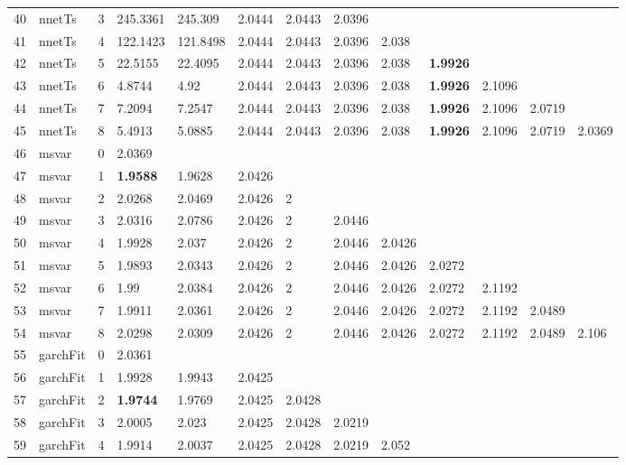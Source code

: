 \documentclass[10pt,a4paper]{article}
\begin{document}
\begin{table}[ht]
\begin{tabular}{rlrllllllllll}
  40 & nnetTs &     3 & 245.3361 & 245.309 & 2.0444 & 2.0443 & 2.0396 &  &  &  &  &  \\ 
  41 & nnetTs &     4 & 122.1423 & 121.8498 & 2.0444 & 2.0443 & 2.0396 & 2.038 &  &  &  &  \\ 
  42 & nnetTs &     5 & 22.5155 & 22.4095 & 2.0444 & 2.0443 & 2.0396 & 2.038 & \textbf{1.9926} &  &  &  \\ 
  43 & nnetTs &     6 & 4.8744 & 4.92 & 2.0444 & 2.0443 & 2.0396 & 2.038 & \textbf{1.9926} & 2.1096 &  &  \\ 
  44 & nnetTs &     7 & 7.2094 & 7.2547 & 2.0444 & 2.0443 & 2.0396 & 2.038 & \textbf{1.9926} & 2.1096 & 2.0719 &  \\ 
  45 & nnetTs &     8 & 5.4913 & 5.0885 & 2.0444 & 2.0443 & 2.0396 & 2.038 & \textbf{1.9926} & 2.1096 & 2.0719 & 2.0369 \\ 
   \hline
46 & msvar &     0 & 2.0369 &  &  &  &  &  &  &  &  &  \\ 
  47 & msvar &     1 & \textbf{1.9588} & 1.9628 & 2.0426 &  &  &  &  &  &  &  \\ 
  48 & msvar &     2 & 2.0268 & 2.0469 & 2.0426 & 2 &  &  &  &  &  &  \\ 
  49 & msvar &     3 & 2.0316 & 2.0786 & 2.0426 & 2 & 2.0446 &  &  &  &  &  \\ 
  50 & msvar &     4 & 1.9928 & 2.037 & 2.0426 & 2 & 2.0446 & 2.0426 &  &  &  &  \\ 
  51 & msvar &     5 & 1.9893 & 2.0343 & 2.0426 & 2 & 2.0446 & 2.0426 & 2.0272 &  &  &  \\ 
  52 & msvar &     6 & 1.99 & 2.0384 & 2.0426 & 2 & 2.0446 & 2.0426 & 2.0272 & 2.1192 &  &  \\ 
  53 & msvar &     7 & 1.9911 & 2.0361 & 2.0426 & 2 & 2.0446 & 2.0426 & 2.0272 & 2.1192 & 2.0489 &  \\ 
  54 & msvar &     8 & 2.0298 & 2.0309 & 2.0426 & 2 & 2.0446 & 2.0426 & 2.0272 & 2.1192 & 2.0489 & 2.106 \\ 
   \hline
55 & garchFit &     0 & 2.0361 &  &  &  &  &  &  &  &  &  \\ 
  56 & garchFit &     1 & 1.9928 & 1.9943 & 2.0425 &  &  &  &  &  &  &  \\ 
  57 & garchFit &     2 & \textbf{1.9744} & 1.9769 & 2.0425 & 2.0428 &  &  &  &  &  &  \\ 
  58 & garchFit &     3 & 2.0005 & 2.023 & 2.0425 & 2.0428 & 2.0219 &  &  &  &  &  \\ 
  59 & garchFit &     4 & 1.9914 & 2.0037 & 2.0425 & 2.0428 & 2.0219 & 2.052 &  &  &  &  \\ 

\end{tabular}
\end{table}
\end{document}
